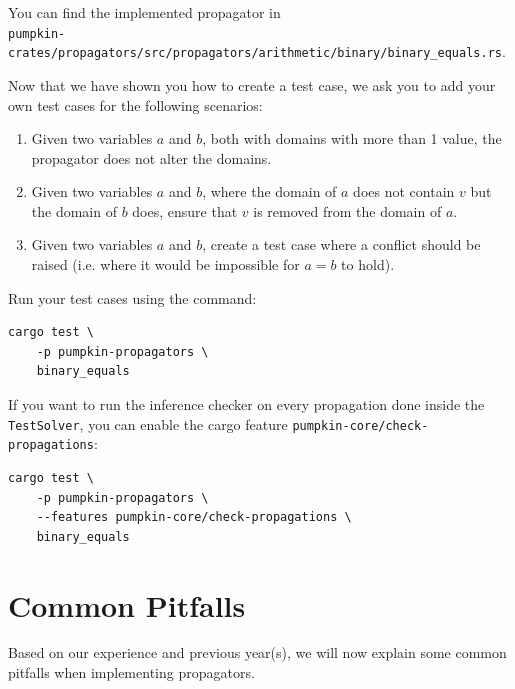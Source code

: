 \documentclass{article}
\begin{document}
        \begin{Exercise}
            You can find the implemented propagator in \\ \texttt{pumpkin-crates/propagators/src/propagators/arithmetic/binary/binary\_equals.rs}.

            Now that we have shown you how to create a test case, we ask you to add your own test cases for the following scenarios:
            \begin{enumerate}
                \item
                    Given two variables $a$ and $b$, both with domains with more than 1 value, the propagator does not alter the domains.
                \item 
                    Given two variables $a$ and $b$, where the domain of $a$ does not contain $v$ but the domain of $b$ does, ensure that $v$ is removed from the domain of $a$.
                \item 
                    Given two variables $a$ and $b$, create a test case where a conflict should be raised (i.e. where it would be impossible for $a = b$ to hold).
            \end{enumerate}
            \bigskip
            Run your test cases using the command:
            \begin{verbatim}
cargo test \
    -p pumpkin-propagators \
    binary_equals
            \end{verbatim}
            
            If you want to run the inference checker on every propagation done inside the \texttt{TestSolver}, you can enable the cargo feature \texttt{pumpkin-core/check-propagations}:
            \begin{verbatim}
cargo test \
    -p pumpkin-propagators \
    --features pumpkin-core/check-propagations \
    binary_equals
            \end{verbatim}
        \end{Exercise}

\section{Common Pitfalls}
    Based on our experience and previous year(s), we will now explain some common pitfalls when implementing propagators.
\end{document}

